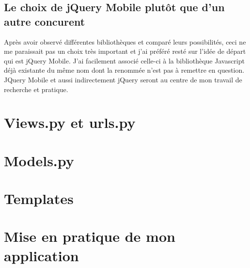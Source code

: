 \documentclass[a4paper,12pt,oneside]{sphinxmanual}
\begin{document}
\section{Le choix de jQuery Mobile plutôt que d'un autre concurent}
\label{presentation_jQM:le-choix-de-jquery-mobile-plutot-que-d-un-autre-concurent}
Après avoir observé différentes bibliothèques et comparé leurs possibilités,
ceci ne me paraissait pas un choix très important et j'ai préféré resté sur
l'idée de départ qui est jQuery Mobile. J'ai facilement associé celle-ci
à la bibliothèque Javascript déjà existante du même nom dont la renommée n'est pas
à remettre en question. JQuery Mobile et aussi indirectement jQuery seront au
centre de mon travail de recherche et pratique.


\chapter{Views.py et urls.py}
\label{views_urls::doc}\label{views_urls:views-py-et-urls-py}

\chapter{Models.py}
\label{models::doc}\label{models:models-py}

\chapter{Templates}
\label{templates::doc}\label{templates:templates}

\chapter{Mise en pratique de mon application}
\label{pratique::doc}\label{pratique:mise-en-pratique-de-mon-application}
\end{document}
